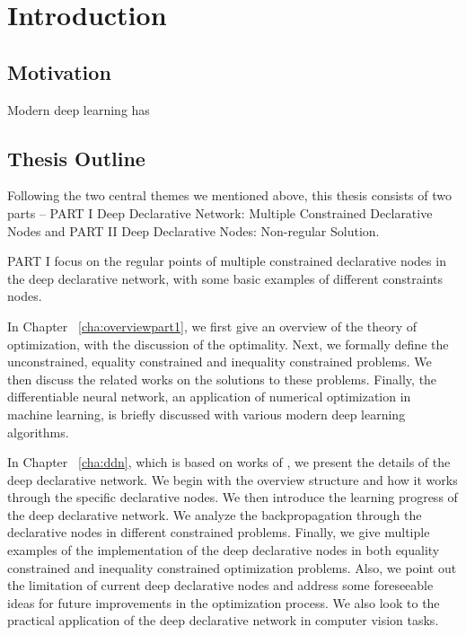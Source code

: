 \chapter{Introduction}
\label{cha:intro}

\section{Motivation}
\label{sec:motivation}
Modern deep learning has 



\section{Thesis Outline}
\label{sec:outline}
Following the two central themes we mentioned above, this thesis consists of two parts -- PART I Deep Declarative Network: Multiple Constrained Declarative Nodes and PART II Deep Declarative Nodes: Non-regular Solution. 
\par PART I focus on the regular points of multiple constrained declarative nodes in the deep declarative network, with some basic examples of different constraints nodes. 
\begin{description}
    \item In Chapter ~\ref{cha:overviewpart1}, we first give an overview of the theory of optimization, with the discussion of the optimality. Next, we formally define the unconstrained, equality constrained and inequality constrained problems. We then discuss the related works on the solutions to these problems. Finally, the differentiable neural network, an application of numerical optimization in machine learning, is briefly discussed with various modern deep learning algorithms.  
    \item In Chapter ~\ref{cha:ddn}, which is based on works of \cite{SG:19}, we present the details of the deep declarative network. We begin with the overview structure and how it works through the specific declarative nodes. We then introduce the learning progress of the deep declarative network. We analyze the backpropagation through the declarative nodes in different constrained problems. Finally, we give multiple examples of the implementation of the deep declarative nodes in both equality constrained and inequality constrained optimization problems. Also, we point out the limitation of current deep declarative nodes and address some foreseeable ideas for future improvements in the optimization process. We also look to the practical application of the deep declarative network in computer vision tasks.
\end{description}

